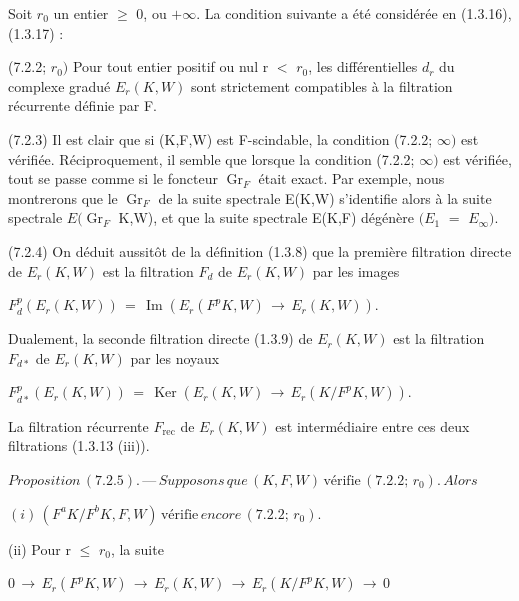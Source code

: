 \documentclass[11pt,twoside]{article}
\newcommand{\DFormula}[1]{%
  \par\smallskip\noindent\hspace*{0pt}\(\displaystyle #1\)\par\smallskip
}
\begin{document}
Soit \(r_{0}\) un entier \(\geq \) 0, ou \(+\infty \). La condition suivante a été considérée en (1.3.16), (1.3.17) :\par
\par\medskip
(7.2.2; \(r_{0})\) Pour tout entier positif ou nul r \(<\) \(r_{0}\), les différentielles \(d_{r}\) du complexe gradué \(E_{r}(K,W)\) sont strictement compatibles à la filtration récurrente définie par F.\par
\par\medskip
(7.2.3) Il est clair que si (K,F,W) est F-scindable, la condition (7.2.2; \(\infty )\) est vérifiée. Réciproquement, il semble que lorsque la condition (7.2.2; \(\infty )\) est vérifiée, tout se passe comme si le foncteur \(\operatorname{Gr}_{F}\) était exact. Par exemple, nous montrerons que le \(\operatorname{Gr}_{F}\) de la suite spectrale E(K,W) s’identifie alors à la suite spectrale \(E(\operatorname{Gr}_{F}\) K,W), et que la suite spectrale E(K,F) dégénère \((E_{1}\) \(=\) \(E_{\infty })\).\par
\par\medskip
(7.2.4) On déduit aussitôt de la définition (1.3.8) que la première filtration directe de \(E_{r}(K,W)\) est la filtration \(F_{d}\) de \(E_{r}(K,W)\) par les images\par
\par\medskip
\DFormula{F_{d}^{p}(E_{r}(K,W))\,=\,\operatorname{Im}(E_{r}(F^{p}K,W)\,\to \,E_{r}(K,W)).}
\par\medskip
Dualement, la seconde filtration directe (1.3.9) de \(E_{r}(K,W)\) est la filtration \(F_{d\ast }\) de \(E_{r}(K,W)\) par les noyaux\par
\par\medskip
\DFormula{F_{d\ast }^{p}(E_{r}(K,W))\,=\,\operatorname{Ker}(E_{r}(K,W)\,\to \,E_{r}(K/F^{p}K,W)).}
\par\medskip
La filtration récurrente \(F_{\mathrm{rec}}\) de \(E_{r}(K,W)\) est intermédiaire entre ces deux filtrations (1.3.13 (iii)).\par
\par\medskip
\DFormula{Proposition\,(7.2.5).\,—\,Supposons\,que\,(K,F,W)\,\text{vérifie}\,(7.2.2;\,r_{0}).\,Alors}
\par\medskip
\DFormula{(i)\,(F^{a}K/F^{b}K,F,W)\,\text{vérifie}\,encore\,(7.2.2;\,r_{0}).}
\par\medskip
(ii) Pour r \(\leq \) \(r_{0}\), la suite\par
\par\medskip
\DFormula{0\,\to \,E_{r}(F^{p}K,W)\,\to \,E_{r}(K,W)\,\to \,E_{r}(K/F^{p}K,W)\,\to \,0}
\end{document}
